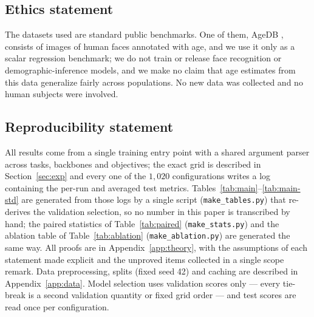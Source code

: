 \documentclass{article} %
\begin{document}
\subsection*{Ethics statement}

The datasets used are standard public benchmarks. One of them, AgeDB
\citep{moschoglou2017agedb}, consists of images of human faces annotated with age, and we
use it only as a scalar regression benchmark; we do not train or release face
recognition or demographic-inference models, and we make no claim that age estimates from
this data generalize fairly across populations. No new data was collected and no human
subjects were involved.

\subsection*{Reproducibility statement}

All results come from a single training entry point with a shared argument parser across
tasks, backbones and objectives; the exact grid is described in Section~\ref{sec:exp} and
every one of the $1{,}020$ configurations writes a log containing the per-run and averaged
test metrics. Tables~\ref{tab:main}--\ref{tab:main-std} are generated from those logs by a
single script (\texttt{make\_tables.py}) that re-derives the validation selection, so no
number in this paper is transcribed by hand; the paired statistics of
Table~\ref{tab:paired} (\texttt{make\_stats.py}) and the ablation table of
Table~\ref{tab:ablation} (\texttt{make\_ablation.py}) are generated the same way. All
proofs are in Appendix~\ref{app:theory}, with the assumptions of each
statement made explicit and the unproved items collected in a single scope remark. Data
preprocessing, splits (fixed seed 42) and caching are described in
Appendix~\ref{app:data}. Model selection uses validation scores only --- every tie-break
is a second validation quantity or fixed grid order --- and test scores are
read once per configuration.
\end{document}
